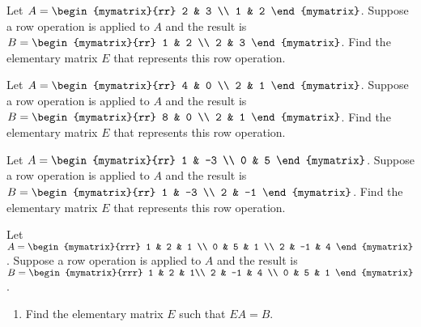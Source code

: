 \begin{enumialphparenastyle}

\begin{ex}
Let $A = \begin{mymatrix}{rr}
2 & 3 \\
1 & 2 
\end{mymatrix}$. Suppose a row operation is applied to $A$ and the result is $B = \begin{mymatrix}{rr}
1 & 2 \\
2 & 3 
\end{mymatrix}$. Find the elementary matrix $E$ that represents this row operation. 
\end{ex}

\begin{ex} 
Let $A = \begin{mymatrix}{rr}
4 & 0 \\
2 & 1 
\end{mymatrix}$. Suppose a row operation is applied to $A$ and the result is $B = \begin{mymatrix}{rr}
8 & 0 \\
2 & 1 
\end{mymatrix}$. Find the elementary matrix $E$ that represents this row operation. 
\end{ex}

\begin{ex} 
Let $A = \begin{mymatrix}{rr}
1 & -3 \\
0 & 5 
\end{mymatrix}$. Suppose a row operation is applied to $A$ and the result is $B = \begin{mymatrix}{rr}
1 & -3 \\
2 & -1 
\end{mymatrix}$. Find the elementary matrix $E$ that represents this row operation. 
\end{ex}

\begin{ex} 
Let $A = \begin{mymatrix}{rrr}
1 & 2 & 1  \\
0 & 5 & 1 \\
2 & -1 & 4
\end{mymatrix}$. Suppose a row operation is applied to $A$ and the result is $B = \begin{mymatrix}{rrr}
1 & 2 & 1\\
2 & -1 & 4 \\
0 & 5 & 1  
\end{mymatrix}$. 
\begin{enumerate}
\item Find the elementary matrix $E$ such that $EA = B$. 


\end{enumerate}
\end{ex}
\end{enumialphparenastyle}
